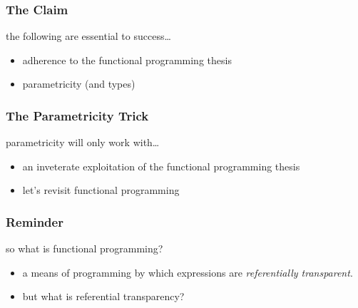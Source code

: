 \begin{frame}
\frametitle{The Claim}
\begin{block}{the following are essential to success\ldots}
\begin{itemize}
\item<1-> adherence to the functional programming thesis
\item<2-> parametricity (and types)
\end{itemize}
\end{block}
\end{frame}

\begin{frame}[fragile]
\frametitle{The Parametricity Trick}
\begin{block}{parametricity will only work with\ldots}
\begin{itemize}
\item<1-> an inveterate exploitation of the functional programming thesis
\item<2-> let's revisit functional programming
\end{itemize}
\end{block}
\end{frame}

\begin{frame}
\frametitle{Reminder}
\begin{block}{so what is functional programming?}
\begin{itemize}
\item<1-> a means of programming by which expressions are \emph{referentially transparent}.
\item<2-> but what is referential transparency?
\end{itemize}
\end{block}
\end{frame}
